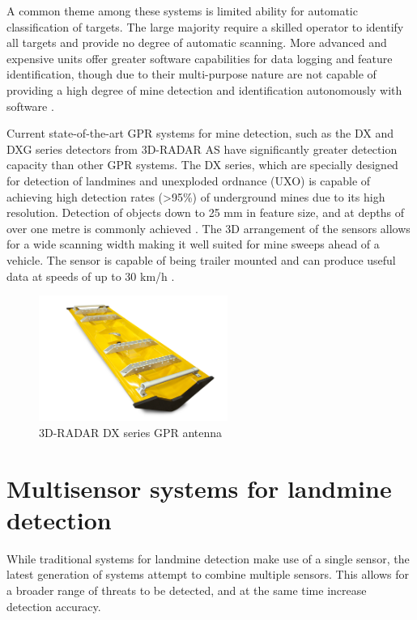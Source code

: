 \documentclass[main.tex]{subfiles}
\begin{document}
\begin{appendices}
A common theme among these systems is limited ability for automatic classification of targets. The large majority require a skilled operator to identify all targets and provide no degree of automatic scanning. More advanced and expensive units offer greater software capabilities for data logging and feature identification, though due to their multi-purpose nature are not capable of providing a high degree of mine detection and identification autonomously with software \parencite{rd8000}.

Current state-of-the-art GPR systems for mine detection, such as the DX and DXG series detectors from 3D-RADAR AS have significantly greater detection capacity than other GPR systems. The DX series, which are specially designed for detection of landmines and unexploded ordnance (UXO) is capable of achieving high detection rates (>95\%) of underground mines due to its high resolution. Detection of objects down to 25 mm in feature size, and at depths of over one metre is commonly achieved \parencite{3dradarDX}. The 3D arrangement of the sensors allows for a wide scanning width making it well suited for mine sweeps ahead of a vehicle. The sensor is capable of being trailer mounted and can produce useful data at speeds of up to 30 km/h \parencite{3dradarDX}.

\begin{figure}[ht]
\centering
\includegraphics[width=0.55\textwidth]{8-Appendices/DX-Series-Antenna-Profile.jpg}
\caption[3D-RADAR DX series GPR antenna]{3D-RADAR DX series GPR antenna \parencite{3dradarDX}}
\end{figure}

\section{Multisensor systems for landmine detection}
While traditional systems for landmine detection make use of a single sensor, the latest generation of systems attempt to combine multiple sensors. This allows for a broader range of threats to be detected, and at the same time increase detection accuracy.  


\end{appendices}
\end{document}
